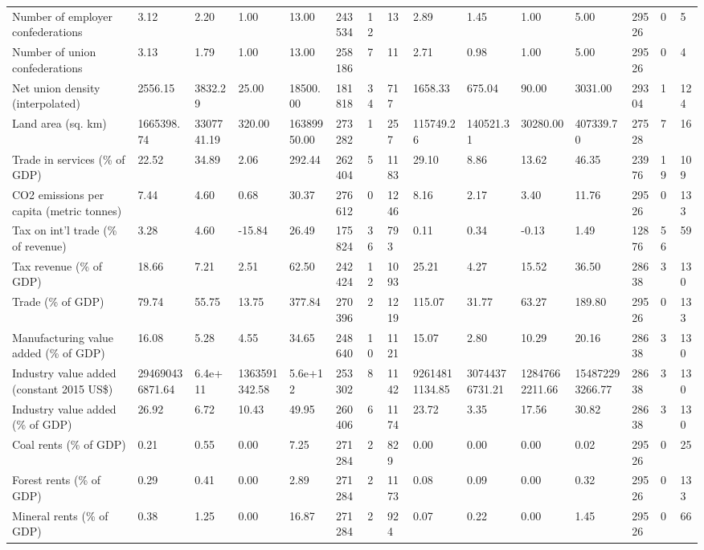 \begin{longtable}{lllllllllllllll}
\addlinespace
Number of employer confederations & 3.12 & 2.20 & 1.00 & 13.00 & 243534 & 12 & 13 & 2.89 & 1.45 & 1.00 & 5.00 & 29526 & 0 & 5\\
Number of union confederations & 3.13 & 1.79 & 1.00 & 13.00 & 258186 & 7 & 11 & 2.71 & 0.98 & 1.00 & 5.00 & 29526 & 0 & 4\\
Net union density (interpolated) & 2556.15 & 3832.29 & 25.00 & 18500.00 & 181818 & 34 & 717 & 1658.33 & 675.04 & 90.00 & 3031.00 & 29304 & 1 & 124\\
Land area (sq. km) & 1665398.74 & 3307741.19 & 320.00 & 16389950.00 & 273282 & 1 & 257 & 115749.26 & 140521.31 & 30280.00 & 407339.70 & 27528 & 7 & 16\\
Trade in services (\% of GDP) & 22.52 & 34.89 & 2.06 & 292.44 & 262404 & 5 & 1183 & 29.10 & 8.86 & 13.62 & 46.35 & 23976 & 19 & 109\\
\addlinespace
CO2 emissions per capita (metric tonnes) & 7.44 & 4.60 & 0.68 & 30.37 & 276612 & 0 & 1246 & 8.16 & 2.17 & 3.40 & 11.76 & 29526 & 0 & 133\\
Tax on int'l trade (\% of revenue) & 3.28 & 4.60 & -15.84 & 26.49 & 175824 & 36 & 793 & 0.11 & 0.34 & -0.13 & 1.49 & 12876 & 56 & 59\\
Tax revenue (\% of GDP) & 18.66 & 7.21 & 2.51 & 62.50 & 242424 & 12 & 1093 & 25.21 & 4.27 & 15.52 & 36.50 & 28638 & 3 & 130\\
Trade (\% of GDP) & 79.74 & 55.75 & 13.75 & 377.84 & 270396 & 2 & 1219 & 115.07 & 31.77 & 63.27 & 189.80 & 29526 & 0 & 133\\
Manufacturing value added (\% of GDP) & 16.08 & 5.28 & 4.55 & 34.65 & 248640 & 10 & 1121 & 15.07 & 2.80 & 10.29 & 20.16 & 28638 & 3 & 130\\
\addlinespace
Industry value added (constant 2015 US\$) & 294690436871.64 & 6.4e+11 & 1363591342.58 & 5.6e+12 & 253302 & 8 & 1142 & 92614811134.85 & 30744376731.21 & 12847662211.66 & 154872293266.77 & 28638 & 3 & 130\\
Industry value added (\% of GDP) & 26.92 & 6.72 & 10.43 & 49.95 & 260406 & 6 & 1174 & 23.72 & 3.35 & 17.56 & 30.82 & 28638 & 3 & 130\\
Coal rents (\% of GDP) & 0.21 & 0.55 & 0.00 & 7.25 & 271284 & 2 & 829 & 0.00 & 0.00 & 0.00 & 0.02 & 29526 & 0 & 25\\
Forest rents (\% of GDP) & 0.29 & 0.41 & 0.00 & 2.89 & 271284 & 2 & 1173 & 0.08 & 0.09 & 0.00 & 0.32 & 29526 & 0 & 133\\
Mineral rents (\% of GDP) & 0.38 & 1.25 & 0.00 & 16.87 & 271284 & 2 & 924 & 0.07 & 0.22 & 0.00 & 1.45 & 29526 & 0 & 66\\

\end{longtable}
